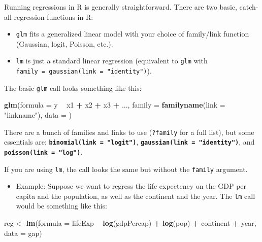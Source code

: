 \documentclass[
]{book}
\newenvironment{Shaded}{\begin{snugshade}}{\end{snugshade}}
\newcommand{\DataTypeTok}[1]{\textcolor[rgb]{0.13,0.29,0.53}{#1}}
\newcommand{\KeywordTok}[1]{\textcolor[rgb]{0.13,0.29,0.53}{\textbf{#1}}}
\newcommand{\NormalTok}[1]{#1}
\newcommand{\OperatorTok}[1]{\textcolor[rgb]{0.81,0.36,0.00}{\textbf{#1}}}
\newcommand{\StringTok}[1]{\textcolor[rgb]{0.31,0.60,0.02}{#1}}
\providecommand{\tightlist}{%
  \setlength{\itemsep}{0pt}\setlength{\parskip}{0pt}}
\begin{document}
Running regressions in R is generally straightforward. There are two basic, catch-all regression functions in R:

\begin{itemize}
\item
  \texttt{glm} fits a generalized linear model with your choice of family/link function (Gaussian, logit, Poisson, etc.).
\item
  \texttt{lm} is just a standard linear regression (equivalent to \texttt{glm} with \texttt{family\ =\ gaussian(link\ =\ "identity")}).
\end{itemize}

The basic \texttt{glm} call looks something like this:

\begin{Shaded}
\begin{Highlighting}[]
\KeywordTok{glm}\NormalTok{(}\DataTypeTok{formula =}\NormalTok{ y }\OperatorTok{~}\StringTok{ }\NormalTok{x1 }\OperatorTok{+}\StringTok{ }\NormalTok{x2 }\OperatorTok{+}\StringTok{ }\NormalTok{x3 }\OperatorTok{+}\StringTok{ }\NormalTok{..., }\DataTypeTok{family =} \KeywordTok{familyname}\NormalTok{(}\DataTypeTok{link =} \StringTok{"linkname"}\NormalTok{), }\DataTypeTok{data =}\NormalTok{ )}
\end{Highlighting}
\end{Shaded}

There are a bunch of families and links to use (\texttt{?family} for a full list), but some essentials are: \textbf{\texttt{binomial(link\ =\ "logit")}}, \textbf{\texttt{gaussian(link\ =\ "identity")}}, and \textbf{\texttt{poisson(link\ =\ "log")}}.

If you are using \texttt{lm}, the call looks the same but without the \texttt{family} argument.

\begin{itemize}
\tightlist
\item
  Example: Suppose we want to regress the life expectency on the GDP per capita and the population, as well as the continent and the year. The \texttt{lm} call would be something like this:
\end{itemize}

\begin{Shaded}
\begin{Highlighting}[]
\NormalTok{reg <-}\StringTok{ }\KeywordTok{lm}\NormalTok{(}\DataTypeTok{formula =}\NormalTok{ lifeExp }\OperatorTok{~}\StringTok{ }\KeywordTok{log}\NormalTok{(gdpPercap) }\OperatorTok{+}\StringTok{ }\KeywordTok{log}\NormalTok{(pop) }\OperatorTok{+}\StringTok{ }\NormalTok{continent }\OperatorTok{+}\StringTok{ }\NormalTok{year, }\DataTypeTok{data =}\NormalTok{ gap)}
\end{Highlighting}
\end{Shaded}
\end{document}
